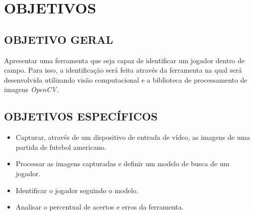\chapter{OBJETIVOS}


\section{{OBJETIVO GERAL}}
Apresentar uma ferramenta que seja capaz de identificar um jogador dentro de campo. Para isso, a identificação será feita através da ferramenta na qual será desenvolvida utilizando visão computacional e a biblioteca de processamento de imagens \textit{OpenCV}. 


\section{{OBJETIVOS ESPECÍFICOS}}
 \begin{itemize}
   \item Capturar, através de um dispositivo de entrada de vídeo, as imagens de uma partida de futebol americano.
   
   \item Processar as imagens capturadas e definir um modelo de busca de um jogador.
   
   \item Identificar o jogador seguindo o modelo.
   
   \item Analisar o percentual de acertos e erros da ferramenta.
   
 \end{itemize}